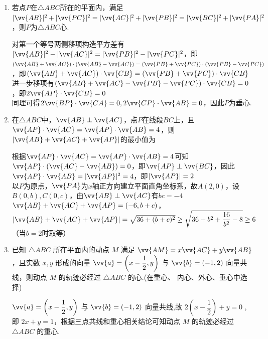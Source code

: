 \begin{enumerate}
\begin{enumerate}
        \item 若点$P$在$\triangle ABC$所在的平面内，满足$|\vv{AB}|^2+|\vv{PC}|^2 = |\vv{AC}|^2+|\vv{PB}|^2 = |\vv{BC}|^2+|\vv{PA}|^2$，则$P$为$\triangle ABC$心.
        \begin{jieda}
            对第一个等号两侧移项构造平方差有$|\vv{AB}|^2 - |\vv{AC}|^2 = |\vv{PB}|^2-|\vv{PC}|^2$，即$\left(\vv{AB} + \vv{AC}\right) \cdot \left(\vv{AB} - \vv{AC}\right) = \left(\vv{PB} + \vv{PC}\right) \cdot \left(\vv{PB} - \vv{PC}\right)$，即$\left(\vv{AB} + \vv{AC}\right) \cdot \vv{CB} = \left(\vv{PB} + \vv{PC}\right) \cdot \vv{CB}$ \\
            进一步移项有$\left(\vv{AB} + \vv{AC} - \vv{PB} - \vv{PC}\right) \cdot \vv{CB} = 0$，即$2\vv{AP} \cdot \vv{CB} = 0$ \\
            同理可得$2\vv{BP} \cdot \vv{CA} = 0, 2\vv{CP} \cdot \vv{AB} = 0$，因此$P$为垂心.
        \end{jieda}

        \item 在$\triangle ABC$中，$\vv{AB} \perp \vv{AC}$，点$P$在线段$BC$上，且$\vv{AP} \cdot \vv{AC} = \vv{AP} \cdot \vv{AB} = 4$，则$|\vv{AB} + \vv{AC} + \vv{AP}|$的最小值为
        \begin{jieda}
            根据$\vv{AP} \cdot \vv{AC} = \vv{AP} \cdot \vv{AB} = 4$可知$\vv{AP} \cdot (\vv{AC} - \vv{AB}) = 0$，即$\vv{AP} \perp \vv{BC}$，因此$\vv{AP} \cdot \vv{AB} = |\vv{AP}|^2 = 4$，即$|\vv{AP}| = 2$ \\
            以$P$为原点，$\vv{PA}$为$x$轴正方向建立平面直角坐标系，故$A(2, 0)$，设$B(0, b), C(0, c)$，由$\vv{AB} \perp \vv{AC}$有$bc = -4$ \\
            $\vv{AB} + \vv{AC} + \vv{AP} = (-6, b+c)$，$|\vv{AB} + \vv{AC} + \vv{AP}| = \sqrt{36 + (b+c)^2} \geq \sqrt{36 + b^2 + \dfrac{16}{b^2} - 8} \geq 6$（当$b = 2$时取等）
        \end{jieda}

        \item 已知 $\bigtriangleup  {ABC}$ 所在平面内的动点 $M$ 满足 $\vv{AM} = x\vv{AC} + y\vv{AB}$ ，且实数 $x,y$ 形成的向量 $\vv{a} = \left( {x - \dfrac{1}{2},y}\right)$ 与 $\vv{b} = \left( {-1,2}\right)$ 向量共线，则动点 $M$ 的轨迹必经过 $\bigtriangleup  {ABC}$ 的心.(在重心、 内心、外心、垂心中选择)
        \begin{jieda}
            $\vv{a} = \left( {x - \dfrac{1}{2},y}\right)$ 与 $\vv{b} = \left( {-1,2}\right)$ 向量共线,故 $2\left( {x - \dfrac{1}{2}}\right)  + y = 0$ ,即 ${2x} + y = 1$，根据三点共线和重心相关结论可知动点 $M$ 的轨迹必经过 $\bigtriangleup  {ABC}$ 的重心.
        \end{jieda}


\end{enumerate}
\end{enumerate}
